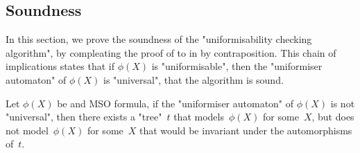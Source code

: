 \documentclass[a4paper,UKenglish,cleveref, autoref, thm-restate]{lipics-v2021}
\begin{document}
\subsection{Soundness}\label{section:soundness}

In this section, we prove the soundness of the "uniformisability checking algorithm", by compleating the proof of  to
 in  by contraposition.
This chain of implications states that if $\phi(X)$ is "uniformisable", then the "uniformiser automaton" of $\phi(X)$ is "universal", \ie that the algorithm is sound.

\begin{lemma}\label{lemma:not-universal-implies-non-invariant}
	Let $\phi(X)$ be and MSO formula,
	if the "uniformiser automaton" of $\phi(X)$ is not  "universal",
	then there exists a "tree"~$t$ that models~$\phi(X)$ for some~$X$, but does not model~$\phi(X)$ for some~$X$
	that would be invariant under the automorphisms of~$t$.
\end{lemma}
\end{document}
